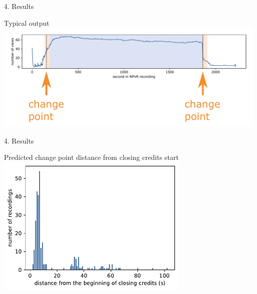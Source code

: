 \documentclass[first=orange,second=blue,logo=blueque]{aaltoslides}
\begin{document}

\begin{frame}{4. Results}
    \begin{block}{{\color{black}Typical output}}
        \center
        \includegraphics[width=1\textwidth]{figures/output1.pdf}
    \end{block}
\end{frame}


\begin{frame}{4. Results}
    \begin{block}{{\color{black}Predicted change point distance from closing credits start}}
        \center
        \includegraphics[width=0.7\textwidth]{figures/result_absolute0.pdf}
    \end{block}
\end{frame}

\end{document}
